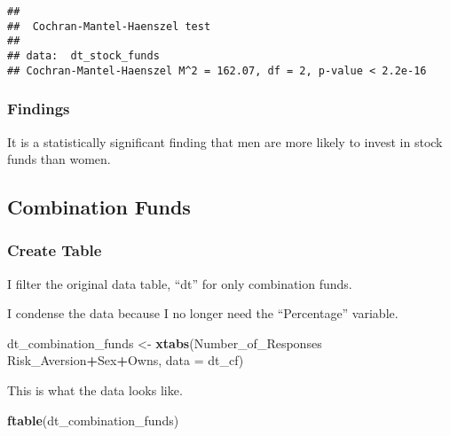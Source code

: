 \documentclass[
]{article}
\newenvironment{Shaded}{\begin{snugshade}}{\end{snugshade}}
\newcommand{\DataTypeTok}[1]{\textcolor[rgb]{0.13,0.29,0.53}{#1}}
\newcommand{\KeywordTok}[1]{\textcolor[rgb]{0.13,0.29,0.53}{\textbf{#1}}}
\newcommand{\NormalTok}[1]{#1}
\newcommand{\OperatorTok}[1]{\textcolor[rgb]{0.81,0.36,0.00}{\textbf{#1}}}
\newcommand{\StringTok}[1]{\textcolor[rgb]{0.31,0.60,0.02}{#1}}
\begin{document}
\begin{verbatim}
## 
##  Cochran-Mantel-Haenszel test
## 
## data:  dt_stock_funds
## Cochran-Mantel-Haenszel M^2 = 162.07, df = 2, p-value < 2.2e-16
\end{verbatim}

\hypertarget{findings-2}{%
\subsubsection{Findings}\label{findings-2}}

It is a statistically significant finding that men are more likely to
invest in stock funds than women.

\hypertarget{combination-funds}{%
\subsection{Combination Funds}\label{combination-funds}}

\hypertarget{create-table-2}{%
\subsubsection{Create Table}\label{create-table-2}}

I filter the original data table, ``dt'' for only combination funds.

\begin{Shaded}
\end{Shaded}

I condense the data because I no longer need the ``Percentage''
variable.

\begin{Shaded}
\begin{Highlighting}[]
\NormalTok{dt_combination_funds <-}\StringTok{ }\KeywordTok{xtabs}\NormalTok{(Number_of_Responses }\OperatorTok{~}\StringTok{ }\NormalTok{Risk_Aversion}\OperatorTok{+}\NormalTok{Sex}\OperatorTok{+}\NormalTok{Owns, }\DataTypeTok{data =}\NormalTok{ dt_cf)}
\end{Highlighting}
\end{Shaded}

This is what the data looks like.

\begin{Shaded}
\begin{Highlighting}[]
\KeywordTok{ftable}\NormalTok{(dt_combination_funds)}
\end{Highlighting}
\end{Shaded}
\end{document}
